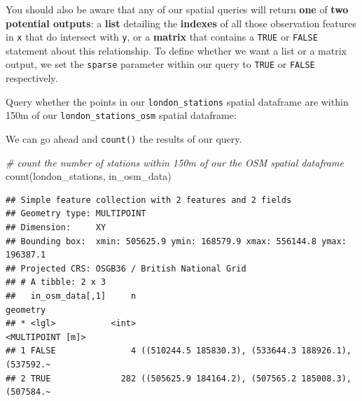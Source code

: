 \documentclass[
]{book}
\newenvironment{Shaded}{\begin{snugshade}}{\end{snugshade}}
\newcommand{\AttributeTok}[1]{\textcolor[rgb]{0.77,0.63,0.00}{#1}}
\newcommand{\CommentTok}[1]{\textcolor[rgb]{0.56,0.35,0.01}{\textit{#1}}}
\newcommand{\ConstantTok}[1]{\textcolor[rgb]{0.00,0.00,0.00}{#1}}
\newcommand{\DecValTok}[1]{\textcolor[rgb]{0.00,0.00,0.81}{#1}}
\newcommand{\FunctionTok}[1]{\textcolor[rgb]{0.00,0.00,0.00}{#1}}
\newcommand{\NormalTok}[1]{#1}
\newcommand{\OtherTok}[1]{\textcolor[rgb]{0.56,0.35,0.01}{#1}}
\newcommand{\SpecialCharTok}[1]{\textcolor[rgb]{0.00,0.00,0.00}{#1}}
\begin{document}
You should also be aware that any of our spatial queries will return \textbf{one} of \textbf{two potential outputs}: a \textbf{list} detailing the \textbf{indexes} of all those observation features in \texttt{x} that do intersect with \texttt{y}, or a \textbf{matrix} that contains a \texttt{TRUE} or \texttt{FALSE} statement about this relationship. To define whether we want a list or a matrix output, we set the \texttt{sparse} parameter within our query to \texttt{TRUE} or \texttt{FALSE} respectively.

Query whether the points in our \texttt{london\_stations} spatial dataframe are within 150m of our \texttt{london\_stations\_osm} spatial dataframe:

\begin{Shaded}
\end{Shaded}

We can go ahead and \texttt{count()} the results of our query.

\begin{Shaded}
\begin{Highlighting}[]
\CommentTok{\# count the number of stations within 150m of our the OSM spatial dataframe}
\FunctionTok{count}\NormalTok{(london\_stations, in\_osm\_data)}
\end{Highlighting}
\end{Shaded}

\begin{verbatim}
## Simple feature collection with 2 features and 2 fields
## Geometry type: MULTIPOINT
## Dimension:     XY
## Bounding box:  xmin: 505625.9 ymin: 168579.9 xmax: 556144.8 ymax: 196387.1
## Projected CRS: OSGB36 / British National Grid
## # A tibble: 2 x 3
##   in_osm_data[,1]     n                                             geometry
## * <lgl>           <int>                                     <MULTIPOINT [m]>
## 1 FALSE               4 ((510244.5 185830.3), (533644.3 188926.1), (537592.~
## 2 TRUE              282 ((505625.9 184164.2), (507565.2 185008.3), (507584.~
\end{verbatim}
\end{document}
